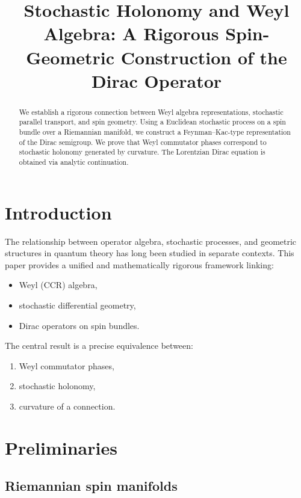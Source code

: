 \documentclass[11pt]{article}
\title{\textbf{Stochastic Holonomy and Weyl Algebra:
A Rigorous Spin-Geometric Construction of the Dirac Operator}}
\author{}
\date{}
\begin{document}
\maketitle

\begin{abstract}
We establish a rigorous connection between Weyl algebra representations,
    stochastic parallel transport, and spin geometry. Using a Euclidean
    stochastic process on a spin bundle over a Riemannian manifold, we
    construct a Feynman--Kac-type representation of the Dirac semigroup.
    We prove that Weyl commutator phases correspond to stochastic holonomy
    generated by curvature. The Lorentzian Dirac equation is obtained via
    analytic continuation.
\end{abstract}

\tableofcontents

\section{Introduction}

The relationship between operator algebra, stochastic processes, and
geometric structures in quantum theory has long been studied in separate
contexts. This paper provides a unified and mathematically rigorous 
framework linking:

\begin{itemize}
\item Weyl (CCR) algebra,
\item stochastic differential geometry,
\item Dirac operators on spin bundles.
\end{itemize}

The central result is a precise equivalence between:
\begin{enumerate}
\item Weyl commutator phases,
\item stochastic holonomy,
\item curvature of a connection.
\end{enumerate}

\section{Preliminaries}

\subsection{Riemannian spin manifolds}
\end{document}

